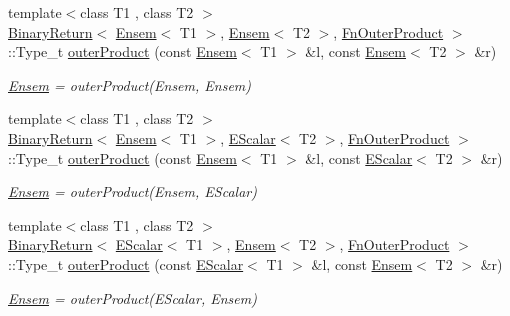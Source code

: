 \begin{DoxyCompactItemize}
{\footnotesize template$<$class T1 , class T2 $>$ }\\\mbox{\hyperlink{structENSEM_1_1BinaryReturn}{Binary\+Return}}$<$ \mbox{\hyperlink{classENSEM_1_1Ensem}{Ensem}}$<$ T1 $>$, \mbox{\hyperlink{classENSEM_1_1Ensem}{Ensem}}$<$ T2 $>$, \mbox{\hyperlink{structENSEM_1_1FnOuterProduct}{Fn\+Outer\+Product}} $>$\+::Type\+\_\+t \mbox{\hyperlink{group__eensem_ga2e9659bc245cd1b2e76ef274c78e26a3}{outer\+Product}} (const \mbox{\hyperlink{classENSEM_1_1Ensem}{Ensem}}$<$ T1 $>$ \&l, const \mbox{\hyperlink{classENSEM_1_1Ensem}{Ensem}}$<$ T2 $>$ \&r)
\begin{DoxyCompactList}\small\item\em \mbox{\hyperlink{classENSEM_1_1Ensem}{Ensem}} = outer\+Product(\+Ensem, Ensem) \end{DoxyCompactList}\item 
{\footnotesize template$<$class T1 , class T2 $>$ }\\\mbox{\hyperlink{structENSEM_1_1BinaryReturn}{Binary\+Return}}$<$ \mbox{\hyperlink{classENSEM_1_1Ensem}{Ensem}}$<$ T1 $>$, \mbox{\hyperlink{classENSEM_1_1EScalar}{E\+Scalar}}$<$ T2 $>$, \mbox{\hyperlink{structENSEM_1_1FnOuterProduct}{Fn\+Outer\+Product}} $>$\+::Type\+\_\+t \mbox{\hyperlink{group__eensem_ga13dd888cacbe0e5a3c85217eeb2c9002}{outer\+Product}} (const \mbox{\hyperlink{classENSEM_1_1Ensem}{Ensem}}$<$ T1 $>$ \&l, const \mbox{\hyperlink{classENSEM_1_1EScalar}{E\+Scalar}}$<$ T2 $>$ \&r)
\begin{DoxyCompactList}\small\item\em \mbox{\hyperlink{classENSEM_1_1Ensem}{Ensem}} = outer\+Product(\+Ensem, E\+Scalar) \end{DoxyCompactList}\item 
{\footnotesize template$<$class T1 , class T2 $>$ }\\\mbox{\hyperlink{structENSEM_1_1BinaryReturn}{Binary\+Return}}$<$ \mbox{\hyperlink{classENSEM_1_1EScalar}{E\+Scalar}}$<$ T1 $>$, \mbox{\hyperlink{classENSEM_1_1Ensem}{Ensem}}$<$ T2 $>$, \mbox{\hyperlink{structENSEM_1_1FnOuterProduct}{Fn\+Outer\+Product}} $>$\+::Type\+\_\+t \mbox{\hyperlink{group__eensem_ga63f92da09e74b21cf1e10e19dbbc9437}{outer\+Product}} (const \mbox{\hyperlink{classENSEM_1_1EScalar}{E\+Scalar}}$<$ T1 $>$ \&l, const \mbox{\hyperlink{classENSEM_1_1Ensem}{Ensem}}$<$ T2 $>$ \&r)
\begin{DoxyCompactList}\small\item\em \mbox{\hyperlink{classENSEM_1_1Ensem}{Ensem}} = outer\+Product(\+E\+Scalar, Ensem) \end{DoxyCompactList}\item 

\end{DoxyCompactItemize}
